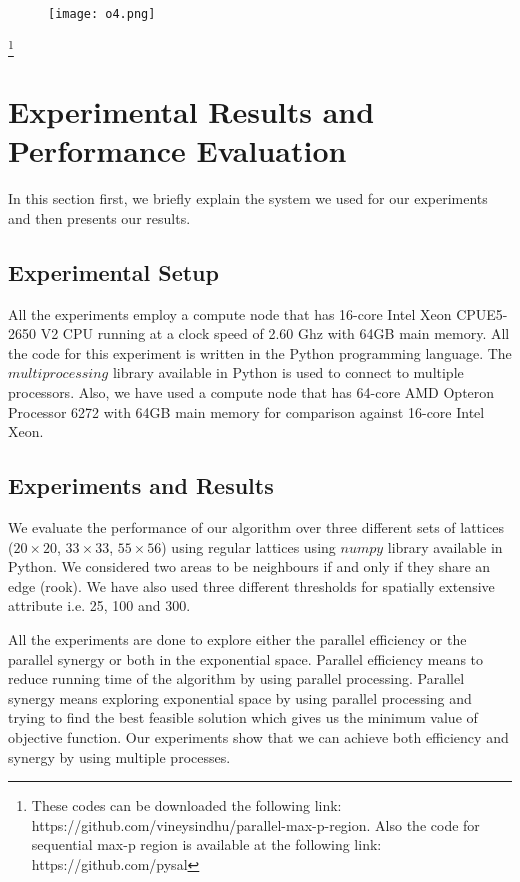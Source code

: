 \documentclass[conference]{IEEEtran}
\begin{document}
\begin{figure}[h]
\texttt{[image: o4.png]}
\end{figure}

\footnote{These codes can be downloaded the following link: https://github.com/vineysindhu/parallel-max-p-region.
Also the code for sequential max-p region is available at the following link: https://github.com/pysal}

\section{Experimental Results and Performance Evaluation}\label{s:experimental}
In this section first, we briefly explain the system we used for our experiments and then presents our results.
\subsection{Experimental Setup}
All the experiments employ a compute node that has 16-core Intel Xeon
CPUE5-2650 V2 CPU running at a clock speed of 2.60 Ghz with 64GB main memory.
All the code for this experiment is written in the Python programming language.
The $multiprocessing$ library available in Python is used to connect to multiple
processors. Also, we have used a compute node that has 64-core AMD Opteron
Processor 6272 with 64GB main memory for comparison against 16-core Intel Xeon.

\subsection{Experiments and Results}

We evaluate the performance of our algorithm over
three different sets
of lattices ($20\times 20$, $33\times 33$, $55\times 56$) 
using regular lattices using $numpy$ library available in Python.
We considered two areas to be neighbours if and only if they share
an edge (rook). We have also used three different thresholds for spatially
extensive attribute i.e. 25, 100 and 300.

All the experiments are done to explore either the parallel
efficiency or the parallel synergy or both in the exponential space. Parallel
efficiency means to reduce running time of the algorithm by using parallel
processing. Parallel synergy means exploring exponential space by using parallel
processing and trying to find the best feasible solution which gives us the
minimum value of objective function. Our experiments show that we can achieve
both efficiency and synergy by using multiple processes.
\end{document}
